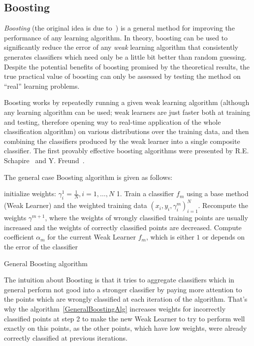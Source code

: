\subsection{Boosting}
\label{subsec:boosting}
\emph{Boosting} (the original idea is due to~\cite{Freund1996}) is a general method for improving the 
performance of any learning algorithm. In
theory, boosting can be used to significantly reduce the error of any \emph{weak} learning algorithm
that consistently generates classifiers which need only be a little bit better than random guessing.
Despite the potential benefits of boosting promised by the theoretical results, the true practical
value of boosting can only be assessed by testing the method on ``real'' learning problems.

Boosting works by repeatedly running a given weak learning algorithm (although any learning algorithm
can be used; weak learners are just faster both at training and testing, therefore opening way
to real-time application of the whole classification algorithm) on various distributions
over the training data, and then combining the classifiers produced by the weak learner into a
single composite classifier. The first provably effective boosting algorithms were presented by
R.E. Schapire~\cite{Schapire1990} and Y. Freund~\cite{Freund1995}.

The general case Boosting algorithm is given as follows:

\begin{algorithm}[H]
 \label{GeneralBoostingAlg}
 \SetAlgoLined
 initialize weights: $\gamma_i^1 = \frac{1}{N}, i = 1, \dotsc, N$\;
 {
  1. Train a classifier $f_m$ using a base method (Weak Learner) and the weighted training data ${(x_i, y_i, \gamma_i^m)}_{i=1}^N$. Recompute the weights $\gamma^{m+1}$, where the weights of wrongly classified training points are usually increased
  and the weights of correctly classified points are decreased. Compute coefficient $\alpha_m$ for the current Weak Learner $f_m$, which is either $1$ or depends on the 
  error of the classifier\;
 }
 \caption{General Boosting algorithm}
\end{algorithm}
The intuition about Boosting is that it tries to aggregate classifiers which in general perform not good into a stronger 
classifier by paying more attention to the points which are wrongly classified at each iteration of the algorithm. That's why
the algorithm~\ref{GeneralBoostingAlg} increases weights for incorrectly classified points at step 2 to make the new Weak Learner
to try to perform well exactly on this points, as the other points, which have low weights, were already correctly classified 
at previous iterations.

